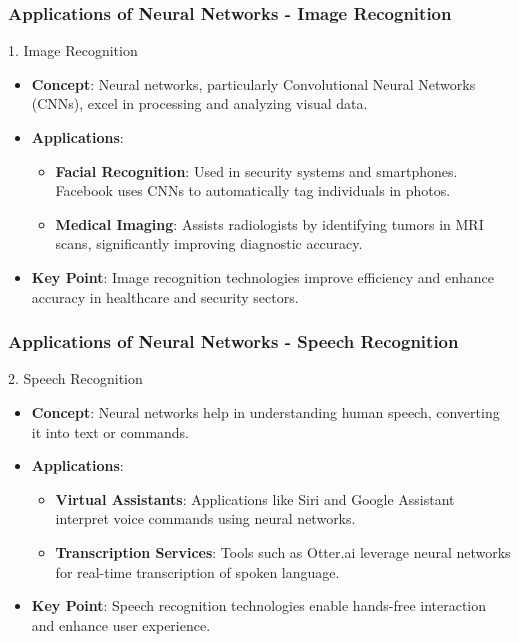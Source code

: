 \documentclass[aspectratio=169]{beamer}
\begin{document}
\begin{frame}[fragile]
    \frametitle{Applications of Neural Networks - Image Recognition}
    \begin{block}{1. Image Recognition}
        \begin{itemize}
            \item \textbf{Concept}: Neural networks, particularly Convolutional Neural Networks (CNNs), excel in processing and analyzing visual data.
            \item \textbf{Applications}:
                \begin{itemize}
                    \item \textbf{Facial Recognition}: Used in security systems and smartphones. Facebook uses CNNs to automatically tag individuals in photos.
                    \item \textbf{Medical Imaging}: Assists radiologists by identifying tumors in MRI scans, significantly improving diagnostic accuracy.
                \end{itemize}
            \item \textbf{Key Point}: Image recognition technologies improve efficiency and enhance accuracy in healthcare and security sectors.
        \end{itemize}
    \end{block}
\end{frame}

\begin{frame}[fragile]
    \frametitle{Applications of Neural Networks - Speech Recognition}
    \begin{block}{2. Speech Recognition}
        \begin{itemize}
            \item \textbf{Concept}: Neural networks help in understanding human speech, converting it into text or commands.
            \item \textbf{Applications}:
                \begin{itemize}
                    \item \textbf{Virtual Assistants}: Applications like Siri and Google Assistant interpret voice commands using neural networks.
                    \item \textbf{Transcription Services}: Tools such as Otter.ai leverage neural networks for real-time transcription of spoken language.
                \end{itemize}
            \item \textbf{Key Point}: Speech recognition technologies enable hands-free interaction and enhance user experience.
        \end{itemize}
    \end{block}
\end{frame}
\end{document}
